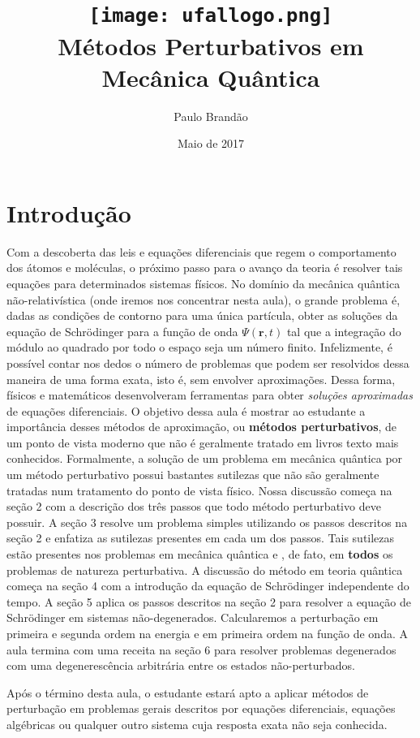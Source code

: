 \documentclass{article}
\title{\texttt{[image: ufallogo.png]} \\
\Huge{\color{astral}\textbf{Métodos Perturbativos em Mecânica Quântica}}}
\author{Paulo Brandão}
\date{Maio de 2017}
\begin{document}
\maketitle

\section{Introdução}

Com a descoberta das leis e equações diferenciais que regem o comportamento dos átomos e moléculas, o próximo passo para o avanço da teoria é resolver tais equações para determinados sistemas físicos. No domínio da mecânica quântica não-relativística (onde iremos nos concentrar nesta aula), o grande problema é, dadas as condições de contorno para uma única partícula, obter as soluções da equação de Schrödinger para a função de onda $\Psi(\mathbf{r},t)$ tal que a integração do módulo ao quadrado por todo o espaço seja um número finito. Infelizmente, é possível contar nos dedos o número de problemas que podem ser resolvidos dessa maneira de uma forma exata, isto é, sem envolver aproximações. Dessa forma, físicos e matemáticos desenvolveram ferramentas para obter \textit{soluções aproximadas} de equações diferenciais. O objetivo dessa aula é mostrar ao estudante a importância desses métodos de aproximação, ou \textbf{métodos perturbativos}, de um ponto de vista moderno que não é geralmente tratado em livros texto mais conhecidos. Formalmente, a solução de um problema em mecânica quântica por um método perturbativo possui bastantes sutilezas que não são geralmente tratadas num tratamento do ponto de vista físico. Nossa discussão começa na seção 2 com a descrição dos três passos que todo método perturbativo deve possuir. A seção 3 resolve um problema simples utilizando os passos descritos na seção 2 e enfatiza as sutilezas presentes em cada um dos passos. Tais sutilezas estão presentes nos problemas em mecânica quântica e , de fato, em \textbf{todos} os problemas de natureza perturbativa. A discussão do método em teoria quântica começa na seção 4 com a introdução da equação de Schrödinger independente do tempo. A seção 5 aplica os passos descritos na seção 2 para resolver a equação de Schrödinger em sistemas não-degenerados. Calcularemos a perturbação em primeira e segunda ordem na energia e em primeira ordem na função de onda. A aula termina com uma receita na seção 6 para resolver problemas degenerados com uma degenerescência arbitrária entre os estados não-perturbados. 

Após o término desta aula, o estudante estará apto a aplicar métodos de perturbação em problemas gerais descritos por equações diferenciais, equações algébricas ou qualquer outro sistema cuja resposta exata não seja conhecida.
\end{document}
